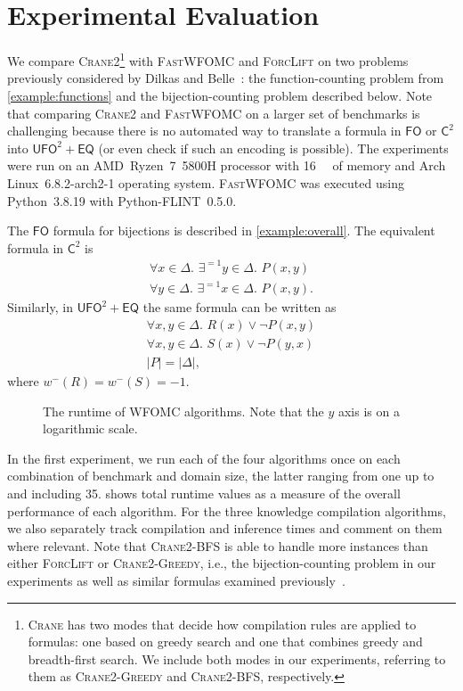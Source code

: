 \documentclass{article}
\theoremstyle{remark}
\newcommand{\Ctwo}{$\mathsf{C}^{2}$}
\newcommand{\FO}{$\mathsf{FO}$}
\newcommand{\UFO}{$\mathsf{UFO}^{2} + \mathsf{EQ}$}
\newcommand{\Cranetwo}{\textsc{Crane2}}
\newcommand{\Cranebfs}{\textsc{Crane2-BFS}}
\newcommand{\Cranegreedy}{\textsc{Crane2-Greedy}}
\begin{document}
\section{Experimental Evaluation}\label{sec:experiments}

We compare \Cranetwo{}\footnote{\textsc{Crane} has two modes that decide how
  compilation rules are applied to formulas: one based on greedy search and one
  that combines greedy and breadth-first search. We include both modes in our
  experiments, referring to them as \Cranegreedy{} and \Cranebfs{},
  respectively.} with \textsc{FastWFOMC} and \textsc{ForcLift} on two problems
previously considered by Dilkas and Belle~:
the function-counting problem from \cref{example:functions} and the
bijection-counting problem described below. Note that comparing \Cranetwo{} and
\textsc{FastWFOMC} on a larger set of benchmarks is challenging because there is
no automated way to translate a formula in \FO{} or \Ctwo{} into \UFO{} (or even
check if such an encoding is possible). The experiments were run on an
AMD~Ryzen~7~5800H processor with \SI{16}{\gibi\byte} of memory and Arch
Linux~6.8.2-arch2-1 operating system. \textsc{FastWFOMC} was executed using
Python~3.8.19 with Python-FLINT~0.5.0.

The \FO{} formula for bijections is described in \cref{example:overall}. The
equivalent formula in \Ctwo{} is
\begin{gather*}
  \forall x \in \Delta\text{. }\exists^{=1} y \in \Delta\text{. }P(x, y)\\
  \forall y \in \Delta\text{. }\exists^{=1} x \in \Delta\text{. }P(x, y).
\end{gather*}
Similarly, in \UFO{} the same formula can be written as
\begin{gather*}
  \forall x, y \in \Delta\text{. }R(x) \lor \neg P(x, y)\\
  \forall x, y \in \Delta\text{. }S(x) \lor \neg P(y, x)\\
  |P| = |\Delta|,
\end{gather*}
where $w^{-}(R) = w^{-}(S) = -1$.

\begin{figure}[t]
  \centering
  
  \caption{The runtime of WFOMC algorithms. Note that the $y$ axis is on a
    logarithmic scale.}\label{fig:plot}
\end{figure}

In the first experiment, we run each of the four algorithms once on each
combination of benchmark and domain size, the latter ranging from one up to and
including 35.  shows total runtime values as a measure of the
overall performance of each algorithm. For the three knowledge compilation
algorithms, we also separately track compilation and inference times and comment
on them where relevant. Note that \Cranebfs{} is able to handle more instances
than either \textsc{ForcLift} or \Cranegreedy{}, i.e., the bijection-counting
problem in our experiments as well as similar formulas examined
previously~\cite{DBLP:conf/kr/DilkasB23}.
\end{document}
